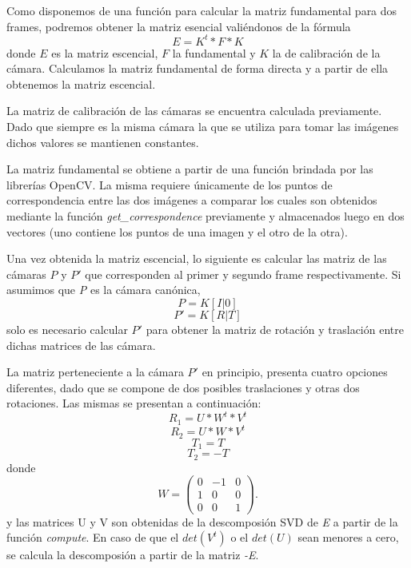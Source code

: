 \documentclass[10pt, a4paper,english,spanish,hidelinks]{article}
\begin{document}
Como disponemos de una función para calcular la matriz fundamental para dos frames, podremos obtener la matriz
esencial valiéndonos de la fórmula
\begin{equation}
E = K^t * F * K
\end{equation}
donde $E$ es la matriz escencial, $F$ la fundamental y $K$ la de calibración de la cámara. Calculamos la matriz fundamental de forma directa 
y a partir de ella obtenemos la matriz escencial. 

La matriz de calibración de las cámaras se encuentra calculada previamente. Dado que siempre es la misma 
cámara la que se utiliza para tomar las imágenes dichos valores se mantienen constantes.

La matriz fundamental se obtiene a partir de una función brindada 
por las librerías OpenCV. La misma requiere únicamente de los puntos de correspondencia entre las dos 
imágenes a comparar los cuales son obtenidos mediante la función
\textit{get\_correspondence} previamente y almacenados luego en dos vectores (uno contiene
los puntos de una imagen y el otro de la otra).

Una vez obtenida la matriz escencial, lo siguiente es calcular las matriz de las cámaras  
$P$ y $P'$ que corresponden al primer y segundo frame respectivamente. Si asumimos que \textit{P}
es la cámara canónica,
\begin{equation}
P  = K[ I | 0 ]
\end{equation}
\begin{equation}
P' = K[ R | T ]
\end{equation}
solo es necesario calcular $P'$ para obtener la matriz de rotación y traslación 
entre dichas matrices de las cámara. 

La matriz perteneciente a la cámara $P'$ en principio, presenta cuatro opciones diferentes, dado
que se compone de dos posibles traslaciones y otras dos rotaciones. Las mismas se
presentan a continuación:
\begin{equation}
 R_{1} = U * W^t * V^t
\end{equation}
\begin{equation}
 R_{2} = U * W * V^t 
 \end{equation}
\begin{equation}
 T_{1} = T 
 \end{equation}
\begin{equation}
 T_{2} = -T
\end{equation}
donde 
\[ W = \left( \begin{array}{ccc}
0 & -1 & 0 \\
1 & 0 & 0\\
0 & 0 & 1\end{array} \right).\] 
y las matrices U y V son obtenidas de la descomposión SVD de \textit{E} a partir de la función 
\textit{compute}. En caso de que el $det(V^{t})$ o el $det(U)$ sean menores a cero, se calcula
la descomposión a partir de la matriz \textit{-E}.
\end{document}
